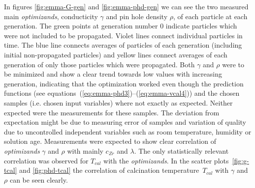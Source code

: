 In figures \ref{fig:emma-G-gen} and \ref{fig:emma-phd-gen} we can see the two measured main \textit{optimizands}, 
conducticity $\gamma$ and pin hole density $\rho$, of each particle at each generation.
The green points at generation number 0 indicate particles which were not included to be propagated. 
Violet lines connect individual particles in time. 
The blue line connects averages of particles of each generation (including initial non-propagated particles) and 
yellow lines connect averages of each generation of only those particles which were propagated. 
%
Both $\gamma$ and $\rho$ were to be minimized and show a clear trend towards low values with increasing generation, 
indicating that the optimization worked even though 
the prediction functions (see equations~(\ref{eq:emma-phd3})--(\ref{eq:emma-vcal4})) 
and the chosen samples (i.e. chosen input variables) where not exactly as expected. 
Neither expected were the measurements for these samples.
The deviation from expectation might be due to measuring error of samples and variation of quality due to uncontrolled independent variables such as room temperature, humidity or solution age. 
Measurements were expected to show clear correlation of \textit{optimizands} $\gamma$ and $\rho$ with mainly $c_{Zr}$ and $\lambda$.
The only statistically relevant correlation was observed for $T_{cal}$ with the \textit{optimizands}.
%
In the scatter plots~\ref{fig:g-tcal} and \ref{fig:phd-tcal} the correlation of calcination temperature~$T_{cal}$ with $\gamma$ and $\rho$ can be seen clearly. 

